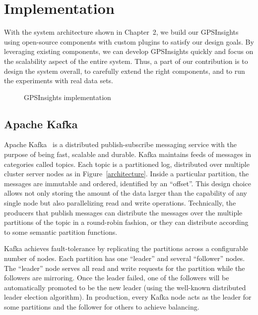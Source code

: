 \documentclass{sig-alternate-05-2015}
\begin{document}
\section{Implementation} 

With the system architecture shown in Chapter~2, we build our GPSInsights using open-source components with custom plugins to satisfy our design goals. By leveraging existing components, we can develop GPSInsights quickly and focus on the scalability aspect of the entire system. Thus, a part of our contribution is to design the system overall, to carefully extend the right components, and to run the experiments with real data sets.  

\begin{figure}[h]
\centering
{}
\caption{GPSInsights implementation}
\end{figure}

\subsection{Apache Kafka} 

Apache Kafka~\cite{kafkapaper,kafkaweb} is a distributed publish-subscribe messaging service with the purpose of being fast, scalable and durable. Kafka maintains feeds of messages in categories called topics. Each topic is a partitioned log, distributed over multiple cluster server nodes as in Figure~\ref{architecture}. Inside a particular partition, the messages are immutable and ordered, identified by an ``offset''. This design choice allows not only storing the amount of the data larger than the capability of any single node but also parallelizing read and write operations. Technically, the producers that publish messages can distribute the messages over the multiple partitions of the topic in a round-robin fashion, or they can distribute according to some semantic partition functions.

Kafka achieves fault-tolerance by replicating the partitions across a configurable number of nodes. Each partition has one ``leader'' and several ``follower'' nodes. The ``leader'' node serves all read and write requests for the partition while the followers are mirroring. Once the leader failed, one of the followers will be automatically promoted to be the new leader (using the well-known distributed leader election algorithm). In production, every Kafka node acts as the leader for some partitions and the follower for others to achieve balancing. 
\end{document}
